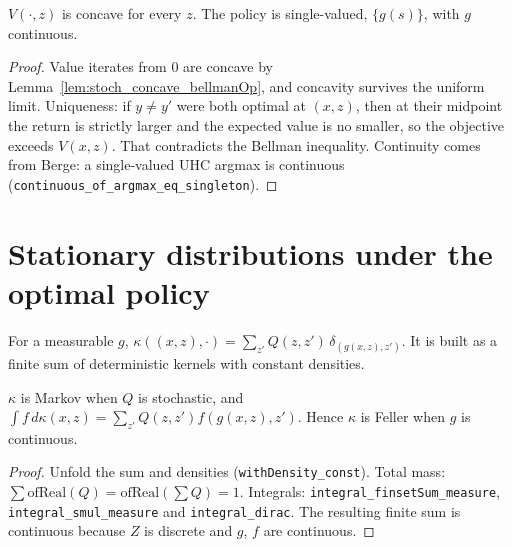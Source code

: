 \begin{theorem}
\label{thm:stoch_value_concave}
\leanok
{}
$V(\cdot, z)$ is concave for every $z$. The policy is single-valued, $\{g(s)\}$, with $g$ continuous.
\end{theorem}
\begin{proof}
\leanok
{}
Value iterates from $0$ are concave by Lemma~\ref{lem:stoch_concave_bellmanOp}, and concavity survives the uniform
limit. Uniqueness: if $y \ne y'$ were both optimal at $(x,z)$, then at their midpoint the return is strictly larger
and the expected value is no smaller, so the objective exceeds $V(x,z)$. That contradicts the Bellman
inequality. Continuity comes from Berge: a single-valued UHC argmax is continuous
(\texttt{continuous\_of\_argmax\_eq\_singleton}).
\end{proof}

\section{Stationary distributions under the optimal policy}
\label{sec:stationary}

\begin{definition}
\label{def:policy_kernel}
\leanok
For a measurable $g$, $\kappa((x,z), \cdot) = \sum_{z'} Q(z,z')\, \delta_{(g(x,z), z')}$. It is built as a finite sum of
deterministic kernels with constant densities.
\end{definition}

\begin{lemma}
\label{lem:policy_kernel}
\leanok
{}
$\kappa$ is Markov when $Q$ is stochastic, and $\int f\,d\kappa(x,z) = \sum_{z'} Q(z,z') f(g(x,z),z')$. Hence
$\kappa$ is Feller when $g$ is continuous.
\end{lemma}
\begin{proof}
\leanok
Unfold the sum and densities (\texttt{withDensity\_const}). Total mass: $\sum \mathrm{ofReal}(Q) =
\mathrm{ofReal}(\sum Q) = 1$. Integrals: \texttt{integral\_finsetSum\_measure}, \texttt{integral\_smul\_measure} and
\texttt{integral\_dirac}. The resulting finite sum is continuous because $Z$ is discrete and $g$, $f$ are continuous.
\end{proof}

